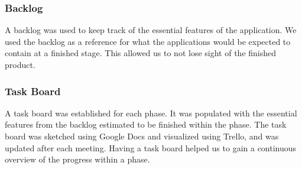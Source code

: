             \subsubsection{Backlog}
                A backlog was used to keep track of the essential features of the application. We used the backlog as a reference for what the applications would be expected to contain at a finished stage. This allowed us to not lose sight of the finished product.
                
            \subsubsection{Task Board}
                A task board was established for each phase. It was populated with the essential features from the backlog estimated to be finished within the phase. The task board was sketched using Google Docs\cite{gdocs} and visualized using Trello\cite{trello}, and was updated after each meeting. Having a task board helped us to gain a continuous overview of the progress within a phase.
                
            
